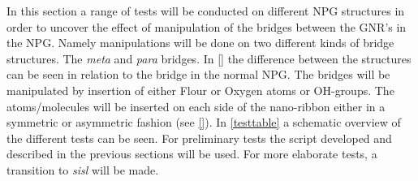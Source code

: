 In this section a range of tests will be conducted on different NPG structures in order to uncover the effect of manipulation of the bridges between the GNR's in the NPG. Namely manipulations will be done on two different kinds of bridge structures. The \textit{meta} and \textit{para} bridges. In \cref{} the difference between the structures can be seen in relation to the bridge in the normal NPG. The bridges will be manipulated by insertion of either Flour or Oxygen atoms or OH-groups. The atoms/molecules will be inserted on each side of the nano-ribbon either in a symmetric or asymmetric fashion (see \cref{}). In \cref{testtable} a schematic overview of the different tests can be seen. For preliminary tests the script developed and described in the previous sections will be used. For more elaborate tests, a transition to \textit{sisl} will be made.
